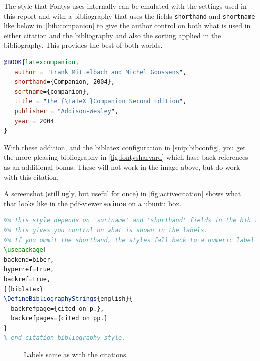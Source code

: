 The style that Fontys uses internally can be emulated with the
settings used in this report and with a bibliography that uses the
fields \texttt{shorthand} and \texttt{shortname} like below
in~\vref{bib:companion} to give the author control on both what is
used in either citation and the bibliography and also the sorting
applied in the bibliography. This provides the best of both worlds.


\begin{lstlisting}[language=BibTeX,caption={\label{bib:companion}Using \texttt{shorthand} for label and \texttt{sortname}for sorting}]
  @BOOK{latexcompanion,
   author = "Frank Mittelbach and Michel Goossens",
   shorthand={Companion, 2004},
   sortname={companion},
   title = "The {\LaTeX }Companion Second Edition",
   publisher = "Addison-Wesley",
   year = 2004
}
\end{lstlisting}

With these addition, and the biblatex configuration in \vref{snip:bibconfig}, you get the more pleasing bibliography in \vref{fig:fontysharvard}
which hase back references as an additional bonus. These will not work in the image above, but do work with this \textcite{latexcompanion} citation.

A screenshot (still ugly, but useful for once) in \vref{fig:activecitation} shows what that looks like in the pdf-viewer \textbf{evince} on a ubuntu box.

\begin{lstlisting}[language=TeX,caption={\label{snip:bibconfig}Using \texttt{shorthand} for label and \texttt{sortname}for sorting}]
%% citation and bibliography style.
%% This style depends on 'sortname' and 'shorthand' fields in the bib file.
%% This gives you control on what is shown in the labels.
%% If you ommit the shorthand, the styles fall back to a numeric label
\usepackage[
backend=biber,
hyperref=true,
backref=true,
]{biblatex}
\DefineBibliographyStrings{english}{
  backrefpage={cited on p.},
  backrefpages={cited on pp.}
}
% end citation bibliography style.
\end{lstlisting}

\begin{figure}
  \caption{\label{fig:fontysharvard}Labels same as with the citations.}
\end{figure}



